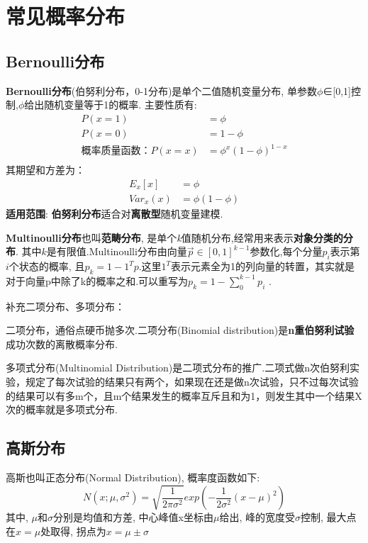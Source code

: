 \section{常见概率分布}\label{ux5e38ux89c1ux6982ux7387ux5206ux5e03}

\subsection{ Bernoulli分布}\label{bernoulliux5206ux5e03}

\textbf{Bernoulli分布}(伯努利分布，0-1分布)是单个二值随机变量分布,
单参数\(\phi\)∈{[}0,1{]}控制,\(\phi\)给出随机变量等于1的概率.
主要性质有: 
\begin{align*}
P(x=1) &= \phi \\
P(x=0) &= 1-\phi  \\
概率质量函数：P(x=x) &= \phi^x(1-\phi)^{1-x} \\
\end{align*}
 其期望和方差为： 
\begin{align*}
E_x[x] &= \phi \\
Var_x(x) &= \phi{(1-\phi)}
\end{align*}
 \textbf{适用范围}:
\textbf{伯努利分布}适合对\textbf{离散型}随机变量建模.

\textbf{Multinoulli分布}也叫\textbf{范畴分布},
是单个\emph{k}值随机分布,经常用来表示\textbf{对象分类的分布}.
其中\(k\)是有限值.Multinoulli分布由向量\(\vec{p}\in[0,1]^{k-1}\)参数化,每个分量\(p_i\)表示第\(i\)个状态的概率,
且\(p_k=1-1^Tp\).这里\(1^T\)表示元素全为1的列向量的转置，其实就是对于向量p中除了k的概率之和.可以重写为\(p_k=1-\sum_{0}^{k-1}p_i\)
.

补充二项分布、多项分布：

二项分布，通俗点硬币抛多次.二项分布(Binomial
distribution)是\textbf{n重伯努利试验}成功次数的离散概率分布.

多项式分布(Multinomial
Distribution)是二项式分布的推广.二项式做n次伯努利实验，规定了每次试验的结果只有两个，如果现在还是做n次试验，只不过每次试验的结果可以有多m个，且m个结果发生的概率互斥且和为1，则发生其中一个结果X次的概率就是多项式分布.

\subsection{ 高斯分布}\label{ux9ad8ux65afux5206ux5e03}

高斯也叫正态分布(Normal Distribution), 概率度函数如下:\\
\[
N(x;\mu,\sigma^2) = \sqrt{\frac{1}{2\pi\sigma^2}}exp\left ( -\frac{1}{2\sigma^2}(x-\mu)^2 \right )
\] 其中, \(\mu​\)和\(\sigma​\)分别是均值和方差,
中心峰值x坐标由\(\mu​\)给出, 峰的宽度受\(\sigma​\)控制,
最大点在\(x=\mu​\)处取得, 拐点为\(x=\mu\pm\sigma​\)

